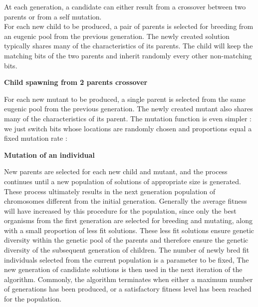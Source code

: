 \documentclass{iSWAGArticle}
\begin{document}
At each generation, a candidate can either result from a crossover between two parents or from a self mutation.
\\\newline
For each new child to be produced, a pair of parents is selected for breeding from an eugenic pool from the previous generation. 
The newly created solution typically shares many of the characteristics of its parents. 
The child will keep the matching bits of the two parents and inherit randomly every other non-matching bits.
\begin{center}
\textbf{\large Child spawning from 2 parents crossover}
\end{center}
\begin{center}
\end{center}
For each new mutant to be produced, a single parent is selected from the same eugenic pool from the previous generation. 
The newly created mutant also shares many of the characteristics of its parent. 
The mutation function is even simpler : we just switch bits whose locations are randomly chosen
and proportions equal a fixed mutation rate : 
\\\newline
\begin{center}
\textbf{\large Mutation of an individual}
\end{center}
\begin{center}
\end{center}
New parents are selected for each new child and mutant, and the process continues until a new population of solutions of appropriate size is generated.
These process ultimately results in the next generation population of chromosomes different from the initial generation. 
Generally the average fitness will have increased by this procedure for the population, 
since only the best organisms from the first generation are selected for breeding and mutating, along with a small proportion of less fit solutions.
These less fit solutions ensure genetic diversity within the genetic pool of the parents and therefore ensure the genetic diversity of the subsequent generation of children.
The number of newly bred fit individuals selected from the current population is a parameter to be fixed, 
The new generation of candidate solutions is then used in the next iteration of the algorithm. 
Commonly, the algorithm terminates when either a maximum number of generations has been produced, or a satisfactory fitness level has been reached for the population.
\end{document}
